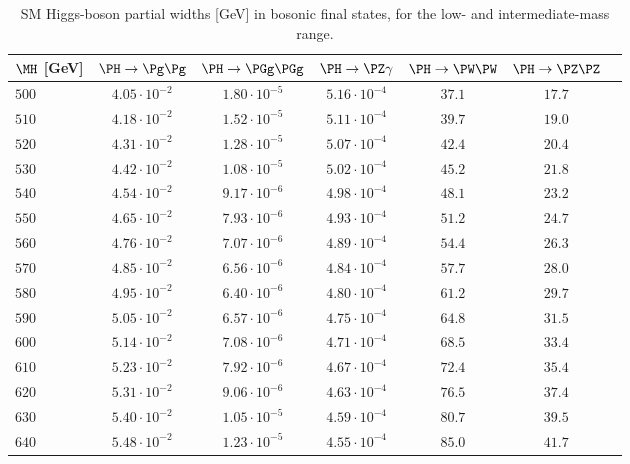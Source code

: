 \begin{table}
  \vspace{-\headsep}
  \caption{SM Higgs-boson partial widths [GeV] in bosonic final states, for the low- and intermediate-mass range.}
  \label{tab:Width-hm.part2}
  \centering
  \small
  \begin{tabular}{lcccccc}
\hline
$\MH$ [GeV] &
$\PH \rightarrow \Pg\Pg$  &  $\PH \rightarrow \PGg \PGg$ & $\PH 
\rightarrow \PZ\gamma$& $\PH \rightarrow \PW\PW$& $\PH \rightarrow \PZ\PZ$ \\
\hline
$500 $&$ 4.05\cdot 10^{-2} $&$ 1.80\cdot 10^{-5} $&$ 5.16\cdot 10^{-4} $&$ 37.1 $&$ 17.7 $\\
$510 $&$ 4.18\cdot 10^{-2} $&$ 1.52\cdot 10^{-5} $&$ 5.11\cdot 10^{-4} $&$ 39.7 $&$ 19.0 $\\
$520 $&$ 4.31\cdot 10^{-2} $&$ 1.28\cdot 10^{-5} $&$ 5.07\cdot 10^{-4} $&$ 42.4 $&$ 20.4 $\\
$530 $&$ 4.42\cdot 10^{-2} $&$ 1.08\cdot 10^{-5} $&$ 5.02\cdot 10^{-4} $&$ 45.2 $&$ 21.8 $\\
$540 $&$ 4.54\cdot 10^{-2} $&$ 9.17\cdot 10^{-6} $&$ 4.98\cdot 10^{-4} $&$ 48.1 $&$ 23.2 $\\
$550 $&$ 4.65\cdot 10^{-2} $&$ 7.93\cdot 10^{-6} $&$ 4.93\cdot 10^{-4} $&$ 51.2 $&$ 24.7 $\\
$560 $&$ 4.76\cdot 10^{-2} $&$ 7.07\cdot 10^{-6} $&$ 4.89\cdot 10^{-4} $&$ 54.4 $&$ 26.3 $\\
$570 $&$ 4.85\cdot 10^{-2} $&$ 6.56\cdot 10^{-6} $&$ 4.84\cdot 10^{-4} $&$ 57.7 $&$ 28.0 $\\
$580 $&$ 4.95\cdot 10^{-2} $&$ 6.40\cdot 10^{-6} $&$ 4.80\cdot 10^{-4} $&$ 61.2 $&$ 29.7 $\\
$590 $&$ 5.05\cdot 10^{-2} $&$ 6.57\cdot 10^{-6} $&$ 4.75\cdot 10^{-4} $&$ 64.8 $&$ 31.5 $\\
$600 $&$ 5.14\cdot 10^{-2} $&$ 7.08\cdot 10^{-6} $&$ 4.71\cdot 10^{-4} $&$ 68.5 $&$ 33.4 $\\
$610 $&$ 5.23\cdot 10^{-2} $&$ 7.92\cdot 10^{-6} $&$ 4.67\cdot 10^{-4} $&$ 72.4 $&$ 35.4 $\\
$620 $&$ 5.31\cdot 10^{-2} $&$ 9.06\cdot 10^{-6} $&$ 4.63\cdot 10^{-4} $&$ 76.5 $&$ 37.4 $\\
$630 $&$ 5.40\cdot 10^{-2} $&$ 1.05\cdot 10^{-5} $&$ 4.59\cdot 10^{-4} $&$ 80.7 $&$ 39.5 $\\
$640 $&$ 5.48\cdot 10^{-2} $&$ 1.23\cdot 10^{-5} $&$ 4.55\cdot 10^{-4} $&$ 85.0 $&$ 41.7 $\\

\end{tabular}
\end{table}
